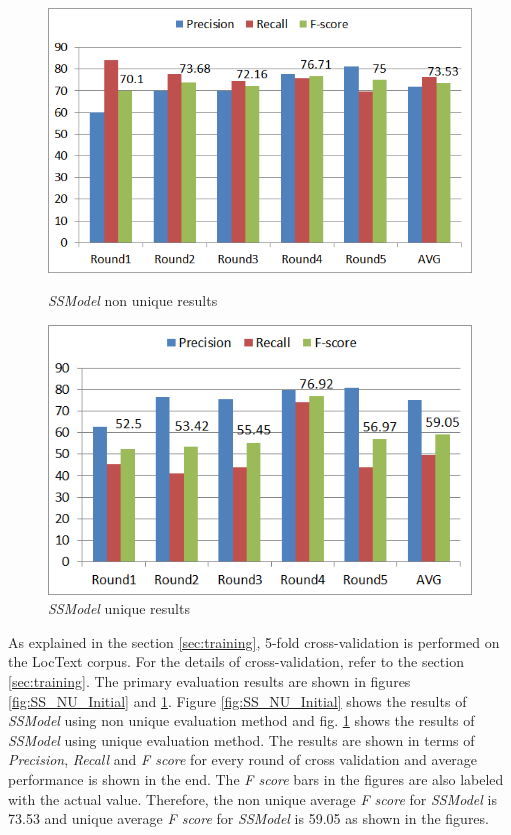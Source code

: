 \begin{figure}
\centering
\begin{minipage}{.5\textwidth}
  \centering
  \includegraphics[width=.95\textwidth]{figures/SSInitialResultsNUniq.png}
  \caption{\textit{SSModel} non unique results}
  \label{fig:SS_NU_Initial}
\end{minipage}%
\begin{minipage}{.5\textwidth}
  \centering
  \includegraphics[width=.95\textwidth]{figures/SSInitialResultsUniq.png}
  \caption{\textit{SSModel} unique results}
  \label{fig:SS_U_Initial}
\end{minipage}
\end{figure}

As explained in the section \ref{sec:training}, 5-fold cross-validation is performed on the LocText corpus. For the details of cross-validation, refer to the section \ref{sec:training}. The primary evaluation results are shown in figures \ref{fig:SS_NU_Initial} and \ref{fig:SS_U_Initial}. Figure \ref{fig:SS_NU_Initial} shows the results of \textit{SSModel} using non unique evaluation method and fig. \ref{fig:SS_U_Initial} shows the results of \textit{SSModel} using unique evaluation method. The results are shown in terms of \textit{Precision}, \textit{Recall} and \textit{F score} for every round of cross validation and average performance is shown in the end. The \textit{F score} bars in the figures are also labeled with the actual value. Therefore, the non unique average \textit{F score} for \textit{SSModel} is 73.53 and unique average \textit{F score} for \textit{SSModel} is 59.05 as shown in the figures.

